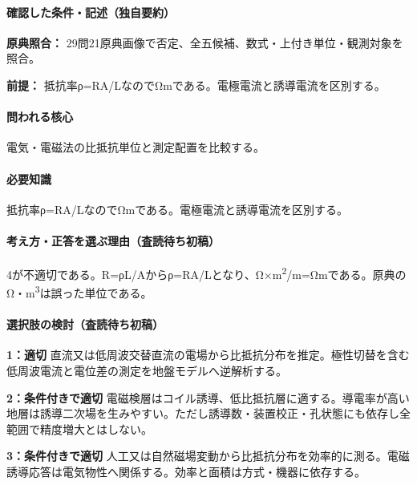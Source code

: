 \paragraph{確認した条件・記述（独自要約）}\mbox{}\par

\noindent\textbf{原典照合：} 29問21原典画像で否定、全五候補、数式・上付き単位・観測対象を照合。\par

\noindent\textbf{前提：} 抵抗率ρ=RA/LなのでΩmである。電極電流と誘導電流を区別する。\par

\paragraph{問われる核心} 電気・電磁法の比抵抗単位と測定配置を比較する。

\paragraph{必要知識} 抵抗率ρ=RA/LなのでΩmである。電極電流と誘導電流を区別する。

\paragraph{考え方・正答を選ぶ理由（査読待ち初稿）} 4が不適切である。R=ρL/Aからρ=RA/Lとなり、Ω×m\textsuperscript{2}/m=Ωmである。原典のΩ・m\textsuperscript{3}は誤った単位である。

\paragraph{選択肢の検討（査読待ち初稿）}\mbox{}\par

\noindent\textbf{1：適切} 直流又は低周波交替直流の電場から比抵抗分布を推定。極性切替を含む低周波電流と電位差の測定を地盤モデルへ逆解析する。\par

\noindent\textbf{2：条件付きで適切} 電磁検層はコイル誘導、低比抵抗層に適する。導電率が高い地層は誘導二次場を生みやすい。ただし誘導数・装置校正・孔状態にも依存し全範囲で精度増大とはしない。\par

\noindent\textbf{3：条件付きで適切} 人工又は自然磁場変動から比抵抗分布を効率的に測る。電磁誘導応答は電気物性へ関係する。効率と面積は方式・機器に依存する。\par

